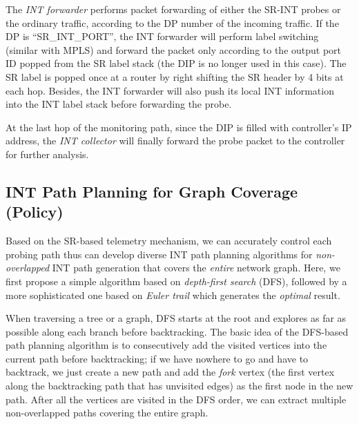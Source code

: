 The \emph{INT forwarder} performs packet forwarding of either the SR-INT probes or the ordinary traffic, according to the DP number of the incoming traffic. If the DP is ``SR\_INT\_PORT'', the INT forwarder will perform label switching (similar with MPLS) and forward the packet only according to the output port ID popped from the SR label stack (the DIP is no longer used in this case). The SR label is popped once at a router by right shifting the SR header by 4 bits at each hop. Besides, the INT forwarder will also push its local INT information into the INT label stack before forwarding the probe. 

At the last hop of the monitoring path, since the DIP is filled with controller's IP address, the \emph{INT collector} will finally forward the probe packet to the controller for further analysis.

\subsection{INT Path Planning for Graph Coverage (Policy)}
\label{subsec:policy}

Based on the SR-based telemetry mechanism, we can accurately control each probing path thus can develop diverse INT path planning algorithms for \emph{non-overlapped} INT path generation that covers the \emph{entire} network graph. Here, we first propose a simple algorithm based on \emph{depth-first search} (DFS), followed by a more sophisticated one based on \emph{Euler trail} which generates the \emph{optimal} result.

When traversing a tree or a graph, DFS starts at the root and explores as far as possible along each branch before backtracking. The basic idea of the DFS-based path planning algorithm is to consecutively add the visited vertices into the current path before backtracking; if we have nowhere to go and have to backtrack, we just create a new path and add the \emph{fork} vertex (the first vertex along the backtracking path that has unvisited edges) as the first node in the new path. After all the vertices are visited in the DFS order, we can extract multiple non-overlapped paths covering the entire graph.



